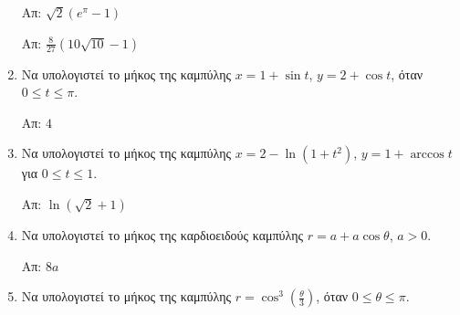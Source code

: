 \begin{enumerate}
		\hfill Απ: $ \sqrt{2} (e^{\pi} - 1)  $

		\hfill Απ: $\frac{8}{27}(10\sqrt{10}-1)$

	\item Να υπολογιστεί το μήκος της καμπύλης $x=1+\sin t$, $y=2+\cos t$, όταν $0\leq t\leq \pi$.

		\hfill Απ: $4$

	\item Να υπολογιστεί το μήκος της καμπύλης $x=2-\ln(1+t^{2})$, $y=1+\arccos t$ για $0\leq t\leq 1$.
		
  \hfill Απ: $\ln(\sqrt{2}+1)$

	\item Να υπολογιστεί το μήκος της καρδιοειδούς καμπύλης $ r = a + a \cos{\theta}
		$, $ a > 0 $.

		\hfill Απ: $ 8 a $

	\item Να υπολογιστεί το μήκος της καμπύλης $ r = \cos^{3}{\left(\frac{\theta}{3}\right)} $, όταν $ 0\leq
		\theta \leq \pi $.
\end{enumerate}




